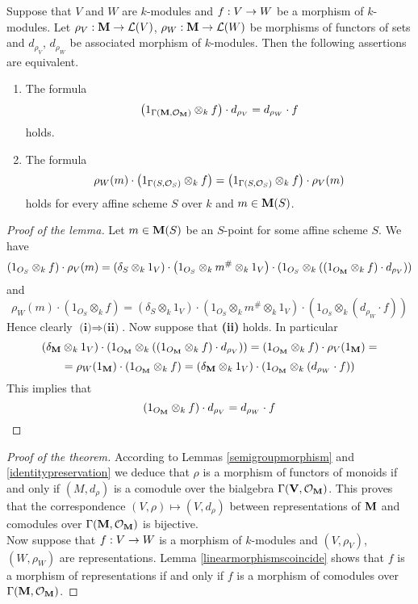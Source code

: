 \begin{lemma}\label{linearmorphismscoincide}
Suppose that $V$ and $W$ are $k$-modules and $f:V\rightarrow W$ be a morphism of $k$-modules. Let $\rho_V:\mathbf{M}\rightarrow {\mathcal L}(V)$, $\rho_W:\mathbf{M}\rightarrow {\mathcal L}(W)$ be morphisms of functors of sets and $d_{\rho_V}$, $d_{\rho_W}$ be associated morphism of $k$-modules. Then the following assertions are equivalent.
\begin{enumerate}[label=\emph{\textbf{(\roman*)}}, leftmargin=1.5em]
\item The formula
$$\left(1_{\Gamma(\mathbf{M},{\mathcal O}_{\mathbf{M}})}\otimes_{k}f\right)\cdot d_{\rho_V}=d_{\rho_W}\cdot f$$
holds.
\item The formula
$$\rho_W(m)\cdot \left(1_{\Gamma(S,{\mathcal O}_S)}\otimes_{k}f\right)=\left(1_{\Gamma(S,{\mathcal O}_S)}\otimes_{k}f\right)\cdot \rho_V(m)$$
holds for every affine scheme $S$ over $k$ and $m\in \mathbf{M}(S)$.
\end{enumerate}
\end{lemma}
\begin{proof}[Proof of the lemma]
Let $m\in \mathbf{M}(S)$ be an $S$-point for some affine scheme $S$. We have
$$\left(1_{O_S}\otimes_{k}f\right)\cdot \rho_V(m)=\left(\delta_S\otimes_{k}1_V\right)\cdot \left(1_{O_S}\otimes_{k}m^{\#}\otimes_{k}1_V\right)\cdot \left(1_{O_S}\otimes_{k}\left(\left(1_{O_{\mathbf{M}}}\otimes_{k}f\right)\cdot d_{\rho_V}\right)\right)$$
and
$$\rho_W(m)\cdot (1_{O_S}\otimes_{k}f)=\left(\delta_S\otimes_{k}1_V\right)\cdot \left(1_{O_S}\otimes_{k}m^{\#}\otimes_{k}1_V\right)\cdot \left(1_{O_S}\otimes_{k}\left(d_{\rho_W}\cdot f\right)\right)$$
Hence clearly $\textbf{(i)}\Rightarrow \textbf{(ii)}$. Now suppose that \textbf{(ii)} holds. In particular
$$\left(\delta_{\mathbf{M}}\otimes_{k}1_V\right)\cdot \left(1_{O_{\mathbf{M}}}\otimes_{k}\left(\left(1_{O_{\mathbf{M}}}\otimes_{k}f\right)\cdot d_{\rho_V}\right)\right)=\left(1_{O_{\mathbf{M}}}\otimes_{k}f\right)\cdot \rho_V(1_{\mathbf{M}})=$$
$$=\rho_W(1_{\mathbf{M}})\cdot (1_{O_{\mathbf{M}}}\otimes_{k}f)=\left(\delta_{\mathbf{M}}\otimes_{k}1_V\right)\cdot \left(1_{O_{\mathbf{M}}}\otimes_{k}\left(d_{\rho_W}\cdot f\right)\right)$$
This implies that 
$$\left(1_{O_{\mathbf{M}}}\otimes_{k}f\right)\cdot d_{\rho_V}=d_{\rho_W}\cdot f$$
\end{proof}

\begin{proof}[Proof of the theorem]
According to Lemmas \ref{semigroupmorphism} and \ref{identitypreservation} we deduce that $\rho$ is a morphism of functors of monoids if and only if $(M,d_{\rho})$ is a comodule over the bialgebra $\Gamma(\mathbf{V},{\mathcal O}_{\mathbf{M}})$. This proves that the correspondence $(V,\rho)\mapsto (V,d_{\rho})$ between representations of $\mathbf{M}$ and comodules over $\Gamma(\mathbf{M},{\mathcal O}_{\mathbf{M}})$ is bijective.\\
Now suppose that $f:V\rightarrow W$ is a morphism of $k$-modules and $(V,\rho_V)$, $(W,\rho_W)$ are representations. Lemma \ref{linearmorphismscoincide} shows that $f$ is a morphism of representations if and only if $f$ is a morphism of comodules over $\Gamma(\mathbf{M},{\mathcal O}_{\mathbf{M}})$.
\end{proof}

